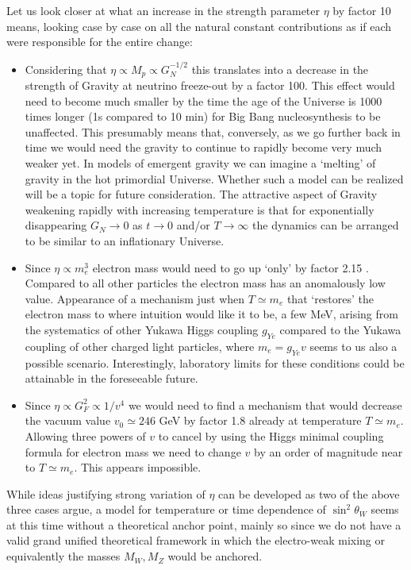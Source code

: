 Let us look closer at what an increase in the strength parameter $\eta$ by factor 10 means, looking case by case on all the natural constant contributions as if each were responsible for the entire change:
\begin{itemize}
\item 
Considering that  $\eta\propto M_p\propto G_N^{-1/2}$ this translates into a decrease  in the strength of Gravity at neutrino freeze-out by a factor 100.  This effect would need to become much smaller by the time the age of the Universe is 1000 times longer (1s compared to 10 min) for Big Bang nucleosynthesis to be unaffected. This presumably means that, conversely, as we go further back in time we would need the gravity to continue to rapidly become very much weaker yet. In models of emergent gravity we can  imagine a  `melting' of gravity in the hot primordial Universe. Whether such a model can be realized will be a topic for future consideration. The attractive aspect of Gravity weakening rapidly with increasing temperature is that for  exponentially disappearing $G_N\to 0$ as $t\to 0$ and/or $T\to \infty$ the dynamics can be arranged to be similar to an inflationary  Universe.
\item 
Since $\eta\propto m_e^3$ electron mass would need to go up `only' by factor 2.15 . Compared to all other particles the electron mass has an anomalously  low value. Appearance of a mechanism just when $T\simeq m_e$ that `restores' the electron mass to where intuition would like it to be, a few MeV, arising from  the systematics of other Yukawa Higgs coupling $g_{Ye}$ compared to the Yukawa coupling of other charged light particles, where $m_e= g_{Ye} v $ seems to us also  a possible scenario. Interestingly,   laboratory limits for these conditions could be attainable in the foreseeable future.
\item
Since $\eta\propto G_F^2\propto 1/v^4$  we would need to find a mechanism that would decrease the vacuum value $v_0\simeq 246$ GeV by factor 1.8 already at temperature $T\simeq m_e$.  Allowing three powers of $v$ to cancel by using the Higgs minimal coupling formula for electron mass  we need to change $v$ by an order of magnitude near to $T\simeq m_e$. This appears impossible.
\end{itemize}
While ideas justifying strong variation of $\eta$ can be developed as two of the above three cases argue, a model for temperature or time dependence of  $\sin^2 \theta_W$ seems at this time without a theoretical anchor point, mainly so since we do not have a valid grand unified theoretical framework in which the electro-weak mixing or equivalently the masses $M_W, M_Z$ would be anchored.


